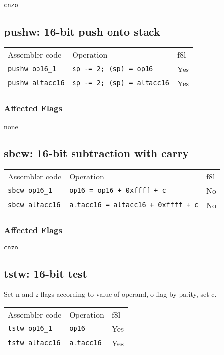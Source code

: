 \documentclass{book}
\begin{document}
\texttt{cnzo}


\subsection{pushw: 16-bit push onto stack}

\begin{tabular}{l l l}
Assembler code          & Operation                         & f8l \\
\texttt{pushw op16\_1}  & \texttt{sp -= 2; (sp) = op16}     & Yes \\
\texttt{pushw altacc16} & \texttt{sp -= 2; (sp) = altacc16} & Yes
\end{tabular}

\subsubsection*{Affected Flags}

none


\subsection{sbcw: 16-bit subtraction with carry}

\begin{tabular}{l l l}
Assembler code         & Operation                                 & f8l \\
\texttt{sbcw op16\_1}  & \texttt{op16 = op16 + 0xffff + c}         & No \\
\texttt{sbcw altacc16} & \texttt{altacc16 = altacc16 + 0xffff + c} & No
\end{tabular}

\subsubsection*{Affected Flags}

\texttt{cnzo}


\subsection{tstw: 16-bit test}

Set n and z flags according to value of operand, o flag by parity, set c.

\begin{tabular}{l l l}
Assembler code         & Operation         & f8l \\
\texttt{tstw op16\_1}  & \texttt{op16}     & Yes \\
\texttt{tstw altacc16} & \texttt{altacc16} & Yes
\end{tabular}
\end{document}
